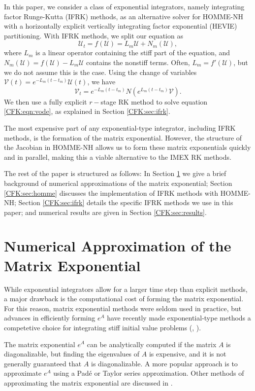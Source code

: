 \documentclass{csri19}
\newcommand{\CFKU}{\mathcal{U}}
\newcommand{\CFKV}{\mathcal{V}}
\begin{document}
In this paper, we consider a class of exponential integrators, namely 
integrating factor Runge-Kutta (IFRK) methods, as an alternative solver for 
HOMME-NH with a horizontally explicit vertically integrating factor 
exponential (HEVIE) partitioning. With IFRK methods, we split our equation 
as \[ \CFKU_t = f(\CFKU) = L_m\CFKU +  N_m(\CFKU),\] where $L_m$ is a 
linear operator containing the stiff part of the equation, and $N_m(\CFKU) 
= f(\CFKU)-L_m\CFKU$ contains the nonstiff terms. Often, $L_m = f'(\CFKU)$, 
but we do not assume this is the case. Using the change of variables 
$\CFKV(t) = e^{-L_m(t-t_m)}\CFKU(t)$, we have \begin{equation}
\label{CFK:eqn:vode}
\CFKV_t = e^{-L_m(t-t_m)}N(e^{L_m(t-t_m)}\CFKV). \end{equation} 
We then use a fully explicit $r-$stage RK method to solve equation 
\ref{CFK:eqn:vode}, as explained in Section \ref{CFK:sec:ifrk}.

The most expensive part of any exponential-type integrator, including IFRK 
methods, is the formation of the matrix exponential. However, the structure 
of the Jacobian in HOMME-NH allows us to form these matrix exponentials 
quickly and in parallel, making this a viable alternative to the IMEX 
RK methods.

The rest of the paper is structured as follows: In Section 
\ref{CFK:sec:matexp} we give a brief background of numerical approximations 
of the matrix exponential; Section \ref{CFK:sec:homme} discusses the 
implementation of IFRK methods with HOMME-NH; Section \ref{CFK:sec:ifrk} 
details the specific IFRK methods we use in this paper; and numerical 
results are given in Section \ref{CFK:sec:results}.

\section{Numerical Approximation of the Matrix Exponential}
\label{CFK:sec:matexp} 
While exponential integrators allow for a larger time step than explicit 
methods, a major drawback is the computational cost of forming the matrix 
exponential. For this reason, matrix exponential methods were seldom used 
in practice, but advances in efficiently forming $e^A$ have recently made 
exponential-type methods a competetive choice for integrating stiff initial 
value problems (\cite{CFK:Garcia2014}, \cite{CFK:Clancy2013}).

The matrix exponential $e^A$ can be analytically computed if the matrix $A$ 
is diagonalizable, but finding the eigenvalues of $A$ is expensive, and it 
is not generally guaranteed that $A$ is diagonalizable. A more popular 
approach is to approximate $e^{A}$ using a Pad\'e or Taylor series 
approximation. Other methods of approximating the matrix exponential are 
discussed in \cite{CFK:Moler2003}.
\end{document}
